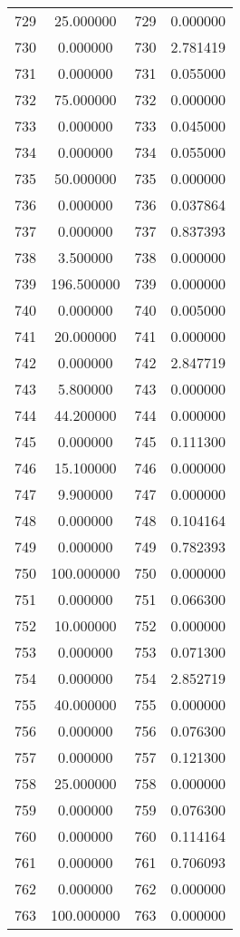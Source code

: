 \documentclass[12pt]{article}
\begin{document}
\begin{longtable}{@{}cccc@{}}
729 & 25.000000 & 729 & 0.000000 \\
730 & 0.000000 & 730 & 2.781419 \\
731 & 0.000000 & 731 & 0.055000 \\
732 & 75.000000 & 732 & 0.000000 \\
733 & 0.000000 & 733 & 0.045000 \\
734 & 0.000000 & 734 & 0.055000 \\
735 & 50.000000 & 735 & 0.000000 \\
736 & 0.000000 & 736 & 0.037864 \\
737 & 0.000000 & 737 & 0.837393 \\
738 & 3.500000 & 738 & 0.000000 \\
739 & 196.500000 & 739 & 0.000000 \\
740 & 0.000000 & 740 & 0.005000 \\
741 & 20.000000 & 741 & 0.000000 \\
742 & 0.000000 & 742 & 2.847719 \\
743 & 5.800000 & 743 & 0.000000 \\
744 & 44.200000 & 744 & 0.000000 \\
745 & 0.000000 & 745 & 0.111300 \\
746 & 15.100000 & 746 & 0.000000 \\
747 & 9.900000 & 747 & 0.000000 \\
748 & 0.000000 & 748 & 0.104164 \\
749 & 0.000000 & 749 & 0.782393 \\
750 & 100.000000 & 750 & 0.000000 \\
751 & 0.000000 & 751 & 0.066300 \\
752 & 10.000000 & 752 & 0.000000 \\
753 & 0.000000 & 753 & 0.071300 \\
754 & 0.000000 & 754 & 2.852719 \\
755 & 40.000000 & 755 & 0.000000 \\
756 & 0.000000 & 756 & 0.076300 \\
757 & 0.000000 & 757 & 0.121300 \\
758 & 25.000000 & 758 & 0.000000 \\
759 & 0.000000 & 759 & 0.076300 \\
760 & 0.000000 & 760 & 0.114164 \\
761 & 0.000000 & 761 & 0.706093 \\
762 & 0.000000 & 762 & 0.000000 \\
763 & 100.000000 & 763 & 0.000000 \\

\end{longtable}
\end{document}
